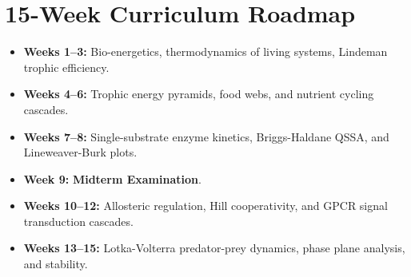 \documentclass[11pt, a4paper]{article}
\begin{document}
\section*{15-Week Curriculum Roadmap}
\begin{itemize}\setlength{\itemsep}{2pt}
    \item \textbf{Weeks 1--3:} Bio-energetics, thermodynamics of living systems, Lindeman trophic efficiency.
    \item \textbf{Weeks 4--6:} Trophic energy pyramids, food webs, and nutrient cycling cascades.
    \item \textbf{Weeks 7--8:} Single-substrate enzyme kinetics, Briggs-Haldane QSSA, and Lineweaver-Burk plots.
    \item \textbf{Week 9:} \textbf{Midterm Examination}.
    \item \textbf{Weeks 10--12:} Allosteric regulation, Hill cooperativity, and GPCR signal transduction cascades.
    \item \textbf{Weeks 13--15:} Lotka-Volterra predator-prey dynamics, phase plane analysis, and stability.
\end{itemize}
\end{document}
